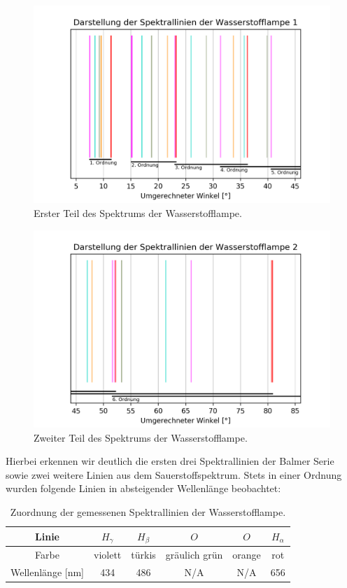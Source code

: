 \documentclass[]{article}
\begin{document}
\begin{figure}[!h]
\centering
\includegraphics[width=1\textwidth]{Plots/HD_Linien_0.png}
\caption{ Erster Teil des Spektrums der Wasserstofflampe. }
\label{fig:H Lines 0}
\end{figure}

\begin{figure}[!h]
\centering
\includegraphics[width=1\textwidth]{Plots/HD_Linien_1.png}
\caption{ Zweiter Teil des Spektrums der Wasserstofflampe.}
\label{fig:H Lines 1}
\end{figure}

Hierbei erkennen wir deutlich die ersten drei Spektrallinien der Balmer Serie sowie zwei weitere Linien aus dem Sauerstoffspektrum. Stets in einer Ordnung wurden folgende Linien in absteigender Wellenlänge beobachtet:

\begin{table}[!hbt]
	\centering
	\begin{tabular}{c|c|c|c|c|c}
		Linie & $H_\gamma$ & $H_\beta$ & $O$ & $O$ & $H_\alpha$ \\
		\hline
		Farbe & violett & türkis & gräulich grün & orange & rot \\
		\hline
		Wellenlänge [nm]  & 434 & 486 & N/A & N/A & 656 \\
	\end{tabular}
	\caption{Zuordnung der gemessenen Spektrallinien der Wasserstofflampe.}
\end{table}
\end{document}
